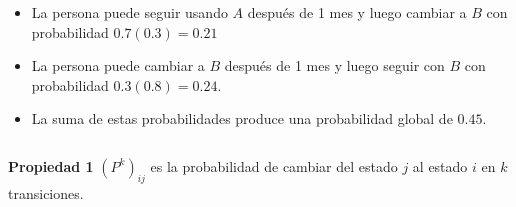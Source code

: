 {\begin{frame}
\begin{columns}[c]
\begin{column}{0.78\textwidth}
\begin{itemize}
				\vspace{3mm}
				\item La persona puede seguir usando $A$ después de 1 mes y luego cambiar a $B$ con probabilidad $0.7(0.3)= 0.21$
				
				\vspace{3mm}
				\item La persona puede cambiar a $B$ después de 1 mes y luego seguir con $B$ con probabilidad $0.3(0.8) = 0.24$.
				
				\vspace{3mm}
				\item La suma de estas probabilidades produce una probabilidad global de {\color{red}$0.45$}.
			\end{itemize}
		\end{column}
	\end{columns}
	
	\vspace{5mm}
	\begin{prop}{\textbf{Propiedad 1 }}\justifying
		$\left(P^k\right)_{ij}$ es la probabilidad de cambiar del estado $j$ al estado $i$ en $k$ transiciones.
	\end{prop}	
	
\end{frame}
}


\subsection{}

